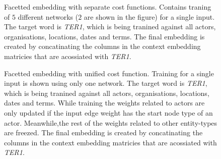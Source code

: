 \begin{figure}
{\small 
{} %

}
\caption{Facetted embedding with separate cost functions. Contains traning of $5$ different networks ($2$ are shown in the figure) for a single input. The target word is \emph{TER1}, which is being tranined against all actors, organisations, locations, dates and terms. The final embedding is created by concatinating the columns in the context embedding matricies that are acossiated with \emph{TER1}.   } \label{fig:separate_cost}
\end{figure}
\begin{figure}
{\small 
{} %

\caption{Facetted embedding with unified cost function. Training for a single input is shown using only one network. The target word is \emph{TER1}, which is being tranined against all actors, organisations, locations, dates and terms. While training the weights related to actors are only updated if the input edge weight has the start node type of an actor. Meanwhile,the rest of the weights related to other entity-types are freezed. The final embedding is created by concatinating the columns in the context embedding matricies that are acossiated with \emph{TER1}.} \label{fig:unified_cost}
}
\end{figure}
